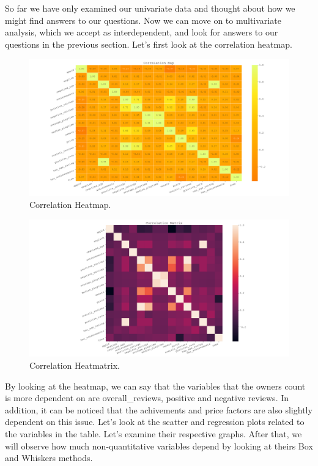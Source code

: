 \documentclass[conference]{IEEEtran}
\begin{document}
So far we have only examined our univariate data and thought about how we might find answers to our questions. Now we can move on to multivariate analysis, which we accept as interdependent, and look for answers to our questions in the previous section. Let's first look at the correlation heatmap.

\begin{figure}[h]
  \includegraphics[width=\linewidth]{assets-2/correlation_map.png}
  \caption{Correlation Heatmap.}
  \label{fig:heatmap1}
\end{figure}
\FloatBarrier

\begin{figure}[h]
  \includegraphics[width=\linewidth]{assets-2/correlation_matrix.png}
  \caption{Correlation Heatmatrix.}
  \label{fig:heatmap2}
\end{figure}
\FloatBarrier

By looking at the heatmap, we can say that the variables that the owners count is more dependent on are overall\_reviews, positive and negative reviews. In addition, it can be noticed that the achivements and price factors are also slightly dependent on this issue. Let's look at the scatter and regression plots related to the variables in the table. Let's examine their respective graphs. After that, we will observe how much non-quantitative variables depend by looking at theirs Box and Whiskers methods.
\end{document}
